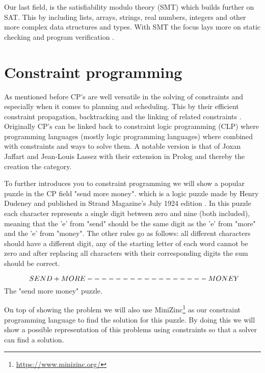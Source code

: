 Our last field, is the satisfiability modulo theory (SMT) which builds further on SAT. This by including lists, arrays, strings, real numbers, integers and other more complex data structures and types. With SMT the focus lays more on static checking and program verification \cite{56bardin2019bringing, 54moura2008z3}.


\section{Constraint programming}
\label{CS:CP}
As mentioned before CP's are well versatile in the solving of constraints and especially when it comes to planning and scheduling. This by their efficient constraint propagation, backtracking and the linking of related constraints \cite{66WikiCP}. Originally CP's can be linked back to constraint logic programming (CLP) where programming languages (mostly logic programming languages) where combined with constraints and ways to solve them. A notable version is that of Joxan Jaffart and Jean-Louis Lassez \cite{65jaffar1987constraint, 66WikiCP} with their extension in Prolog and thereby the creation the category.

To further introduces you to constraint programming we will show a popular puzzle in the CP field "send more money". which is a logic puzzle made by Henry Dudeney and published in Strand Magazine's July 1924 edition \cite{sendMoreMoney}.
In this puzzle each character represents a single digit between zero and nine (both included), meaning that the 'e' from "send" should be the same digit as the 'e' from "more" and the 'e' from "money". The other rules go as follows: all different characters should have a different digit, any of the starting letter of each word cannot be zero and after replacing all characters with their corresponding digits the sum should be correct. 
\begin{center}
	\[$$
	\; \; S E N D\\
	+ M O R E\\
	-----------------\\
	M O N E Y
	$$\] The "send more money" puzzle.
\end{center}
On top of showing the problem we will also use MiniZinc\footnote{\url{https://www.minizinc.org/}} as our constraint programming language to find the solution for this puzzle. By doing this we will show a possible representation of this problems using constraints so that a solver can find a solution.

